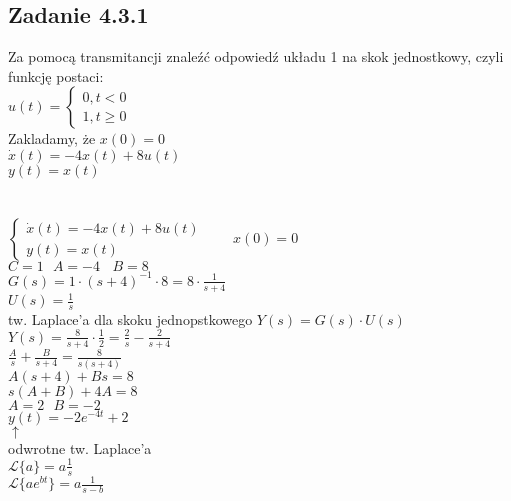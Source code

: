 \pagebreak
\subsection*{Zadanie 4.3.1} {\color{darkgray}
	Za pomocą transmitancji znaleźć odpowiedź układu 1 na skok jednostkowy, czyli funkcję postaci:\\
	$u(t)=\begin{cases}0,t<0 \\ 1, t\geqslant 0 \end{cases}$\\
	Zakladamy, że $x(0)=0$\\
	$\dot{x}(t)=-4x(t)+8u(t)$\\
	$y(t)=x(t)$\\
}\lineh
\\\\
$\begin{cases}\dot{x}(t)=-4x(t)+8u(t)\\y(t)=x(t) \end{cases} \ \ \ \ \ \ \ \ \ x(0)=0$\\
$C=1 \ \ \ A=-4 \ \ \ \ B=8$\\
$G(s)=1 \cdot (s+4)^{-1} \cdot 8 = 8 \cdot \frac{1}{s+4}$\\
$U(s)=\frac 1 s \ \ \ $\\ tw. Laplace'a dla skoku jednopstkowego
$Y(s)=G(s) \cdot U(s)$\\
$Y(s)=\frac{8}{s+4} \cdot \frac{1}{2} = \frac{2}{s} - \frac{2}{s+4}$\\
$\frac{A}{s}+\frac{B}{s+4}=\frac{8}{s(s+4)}$\\
$A(s+4)+Bs=8$\\
$s(A+B)+4A=8$\\
$A=2 \ \ \ B=-2$\\
$\boxed{y(t)=-2e^{-4t}+2}$\\ 
$\uparrow$\\
odwrotne tw. Laplace'a\\
$\mathcal{L}\{a\}=a\frac 1 s$\\
$\mathcal{L}\{ae^{bt}\}=a\frac {1}{s-b}$\\



